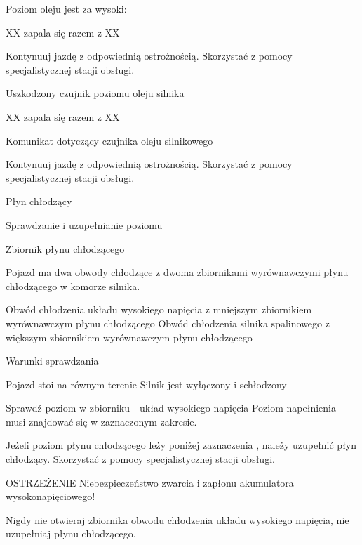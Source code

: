 Poziom oleju jest za wysoki:

XX zapala się razem z XX

\begin{itemizeArrow}
	\itemArrow Kontynuuj jazdę z odpowiednią ostrożnością.
	\itemArrow Skorzystać z pomocy specjalistycznej stacji obsługi.
\end{itemizeArrow}

Uszkodzony czujnik poziomu oleju silnika

XX zapala się razem z XX

Komunikat dotyczący czujnika oleju silnikowego
\begin{itemizeArrow}
	\itemArrow Kontynuuj jazdę z odpowiednią ostrożnością.
	\itemArrow Skorzystać z pomocy specjalistycznej stacji obsługi.
\end{itemizeArrow}


Płyn chłodzący

Sprawdzanie i uzupełnianie poziomu

Zbiornik płynu chłodzącego

Pojazd ma dwa obwody chłodzące z dwoma zbiornikami wyrównawczymi płynu chłodzącego w komorze silnika.
\begin{itemizeTriangle}
	\itemTriangle Obwód chłodzenia układu wysokiego napięcia z mniejszym zbiornikiem wyrównawczym płynu chłodzącego
	\itemTriangle Obwód chłodzenia silnika spalinowego z większym zbiornikiem wyrównawczym płynu chłodzącego
\end{itemizeTriangle}

Warunki sprawdzania
\begin{itemizeTick}
	\itemTick Pojazd stoi na równym terenie
	\itemTick Silnik jest wyłączony i schłodzony
\end{itemizeTick}

Sprawdź poziom w zbiorniku - układ wysokiego napięcia
Poziom napełnienia musi znajdować się w zaznaczonym zakresie.
\begin{itemizeArrow}
	\itemArrow Jeżeli poziom płynu chłodzącego leży poniżej zaznaczenia , należy uzupełnić płyn chłodzący.
	\itemArrow Skorzystać z pomocy specjalistycznej stacji obsługi.
\end{itemizeArrow}

OSTRZEŻENIE
Niebezpieczeństwo zwarcia i zapłonu akumulatora wysokonapięciowego!
\begin{itemizeTriangle}
	\itemTriangle Nigdy nie otwieraj zbiornika obwodu chłodzenia układu wysokiego napięcia, nie uzupełniaj płynu chłodzącego.
\end{itemizeTriangle}

